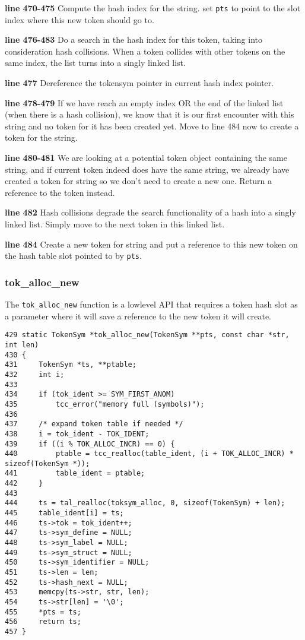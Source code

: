\begin{tcc_desc}
\textbf{line 470-475} Compute the hash index for the string. set \verb|pts| to point to the slot index where this new token should go to.

\textbf{line 476-483} Do a search in the hash index for this token, taking into consideration hash collisions. When a token collides with other tokens on the same index, the list turns into a singly linked list.

\textbf{line 477} Dereference the tokensym pointer in current hash index pointer.

\textbf{line 478-479} If we have reach an empty index OR the end of the linked list (when there is a hash collision), we know that it is our first encounter with this string and no token for it has been created yet. Move to line 484 now to create a token for the string.

\textbf{line 480-481} We are looking at a potential token object containing the same string, and if current token indeed does have the same string, we already have created a token for string so we don't need to create a new one. Return a reference to the token instead.

\textbf{line 482} Hash collisions degrade the search functionality of a hash into a singly linked list. Simply move to the next token in this linked list.

\textbf{line 484} Create a new token for string and put a reference to this new token on the hash table slot pointed to by \verb|pts|.
\end{tcc_desc}

\subsubsection{tok\_alloc\_new}

The \verb|tok_alloc_new| function is a lowlevel API that requires a token hash slot as a parameter where it will save a reference to the new token it will create.

\begin{verbatim}
429 static TokenSym *tok_alloc_new(TokenSym **pts, const char *str, int len)
430 {
431     TokenSym *ts, **ptable;
432     int i;
433
434     if (tok_ident >= SYM_FIRST_ANOM) 
435         tcc_error("memory full (symbols)");
436
437     /* expand token table if needed */
438     i = tok_ident - TOK_IDENT;
439     if ((i % TOK_ALLOC_INCR) == 0) {
440         ptable = tcc_realloc(table_ident, (i + TOK_ALLOC_INCR) * sizeof(TokenSym *));
441         table_ident = ptable;
442     }
443
444     ts = tal_realloc(toksym_alloc, 0, sizeof(TokenSym) + len);
445     table_ident[i] = ts;
446     ts->tok = tok_ident++;
447     ts->sym_define = NULL;
448     ts->sym_label = NULL;
449     ts->sym_struct = NULL;
450     ts->sym_identifier = NULL;
451     ts->len = len;
452     ts->hash_next = NULL;
453     memcpy(ts->str, str, len);
454     ts->str[len] = '\0';
455     *pts = ts;
456     return ts;
457 }
\end{verbatim}

